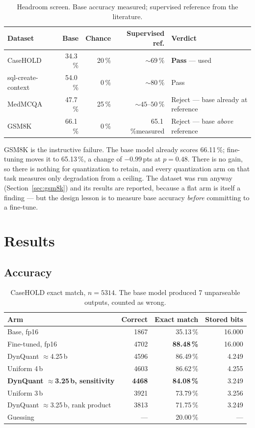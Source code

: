 \documentclass[11pt]{article}
\newcommand{\pt}{\,pts}
\newcommand{\pct}{\,\%}
\begin{document}
\begin{table}[H]
\centering\small
\caption{Headroom screen. Base accuracy measured; supervised reference from the literature.}
\begin{tabular}{lrrrl}
\toprule
Dataset & Base & Chance & Supervised ref. & Verdict \\
\midrule
\rowcolor{rowtint}
CaseHOLD & 34.3\pct & 20\pct & ${\sim}69\pct$ & \textbf{Pass} --- used \\
sql-create-context & 54.0\pct & 0\pct & ${\sim}80\pct$ & Pass \\
MedMCQA & 47.7\pct & 25\pct & ${\sim}45$--$50\pct$ & Reject --- base already at reference \\
GSM8K & 66.1\pct & 0\pct & 65.1\pct measured & Reject --- base \emph{above} reference \\
\bottomrule
\end{tabular}
\end{table}

GSM8K is the instructive failure. The base model already scores 66.11\pct; fine-tuning moves it
to 65.13\pct, a change of $-0.99$\pt{} at $p = 0.48$. There is no gain, so there is nothing for
quantization to retain, and every quantization arm on that task measures only degradation from a
ceiling. The dataset was run anyway (Section~\ref{sec:gsm8k}) and its results are reported,
because a flat arm is itself a finding --- but the design lesson is to measure base accuracy
\emph{before} committing to a fine-tune.

\section{Results}

\subsection{Accuracy}

\begin{table}[H]
\centering\small
\caption{CaseHOLD exact match, $n = 5314$. The base model produced 7 unparseable outputs, counted
as wrong.}
\begin{tabular}{lrrr}
\toprule
Arm & Correct & Exact match & Stored bits \\
\midrule
Base, fp16 & 1867 & 35.13\pct & 16.000 \\
\rowcolor{rowtint}
Fine-tuned, fp16 & 4702 & \textbf{88.48\pct} & 16.000 \\
DynQuant $\approx$4.25\,b & 4596 & 86.49\pct & 4.249 \\
Uniform 4\,b & 4603 & 86.62\pct & 4.255 \\
\rowcolor{rowtint}
\textbf{DynQuant $\approx$3.25\,b, sensitivity} & \textbf{4468} & \textbf{84.08\pct} & 3.249 \\
Uniform 3\,b & 3921 & 73.79\pct & 3.256 \\
DynQuant $\approx$3.25\,b, rank product & 3813 & 71.75\pct & 3.249 \\
\midrule
Guessing & --- & 20.00\pct & --- \\
\bottomrule
\end{tabular}
\end{table}
\end{document}
